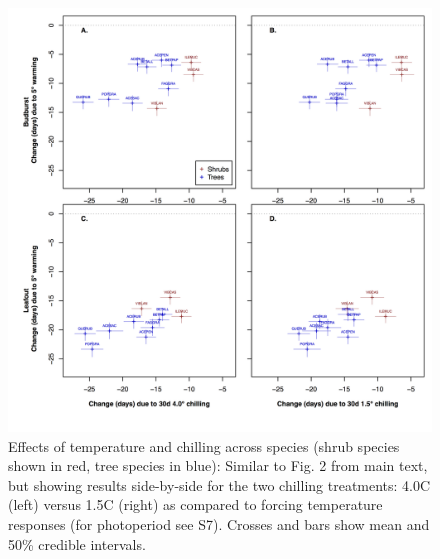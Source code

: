 \documentclass{article}
\begin{document}
\begin{figure}
\label{fig:figS6}
\includegraphics[width=1\textwidth]{FigChill2_4panel.png}
\caption{Effects of temperature and chilling across species (shrub species shown in red, tree species in blue): Similar to Fig. 2 from main text, but showing results side-by-side for the two chilling treatments: 4.0\degree C (left) versus 1.5\degree C (right) as compared to forcing temperature responses (for photoperiod see S7). Crosses and bars show mean and 50\% credible intervals.}
\end{figure}
\end{document}
